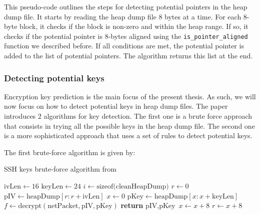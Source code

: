     This pseudo-code outlines the steps for detecting potential pointers in the heap dump file. It starts by reading the heap dump file 8 bytes at a time. For each 8-byte block, it checks if the block is non-zero and within the heap range. If so, it checks if the potential pointer is 8-bytes aligned using the \texttt{is\_pointer\_aligned} function we described before. If all conditions are met, the potential pointer is added to the list of potential pointers. The algorithm returns this list at the end.
    
    \subsubsection{Detecting potential keys}

    Encryption key prediction is the main focus of the present thesis. As such, we will now focus on how to detect potential keys in heap dump files. The paper  introduces 2 algorithms for key detection. The first one is a brute force approach that consists in trying all the possible keys in the heap dump file. The second one is a more sophisticated approach that uses a set of rules to detect potential keys.
    
    The first brute-force algorithm is given by:

    \begin{algorithm}[H]
    \caption{SSH keys brute-force algorithm from  \cite{SmartKex22}}
    \begin{algorithmic}[1]
        \State $\text{ivLen} \gets 16$ 
        \State $\text{keyLen} \gets 24$ 
        \State $i \gets \text{sizeof(cleanHeapDump)}$
        \State $r \gets 0$
            \State $\text{pIV} \gets \text{heapDump}[r : r + \text{ivLen}]$
            \State $x \gets 0$
                \State $\text{pKey} \gets \text{heapDump}[x : x + \text{keyLen}]$
                \State $f \gets \text{decrypt}(\text{netPacket}, \text{pIV}, \text{pKey})$
                    \State \textbf{return} $\text{pIV}, \text{pKey}$
                \EndIf
                \State $x \gets x + 8$ 
            \EndWhile
            \State $r \gets x + 8$ 
        \EndWhile
    \EndProcedure
    \end{algorithmic}
    \end{algorithm}
    
